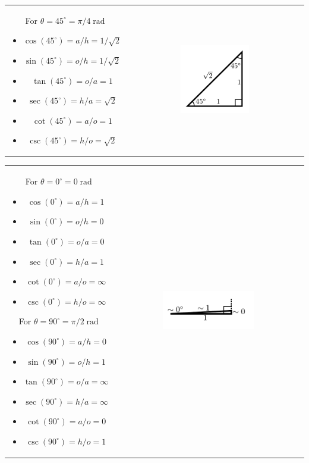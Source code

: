 \documentclass{article}
\newcommand{\dr}[1]{\textcolor{dark_red}{#1}}
\newcommand{\dg}[1]{\textcolor{dark_green}{#1}}
\newcommand{\db}[1]{\textcolor{dark_blue}{#1}}
\begin{document}
\begin{tabular}{cc}
\parbox{0.3\textwidth}{
For \(\theta = 45^\circ = \pi/4\;\text{rad}\)
\begin{itemize}
\item \dr{\(\cos(45^\circ) = a/h = 1/\sqrt{2}\)}
\item \dr{\(\sin(45^\circ) = o/h = 1/\sqrt{2}\)}
\item \dg{\(\tan(45^\circ) = o/a = 1\)}
\item \dg{\(\sec(45^\circ) = h/a = \sqrt{2}\)}
\item \db{\(\cot(45^\circ) = a/o = 1\)}
\item \db{\(\csc(45^\circ) = h/o = \sqrt{2}\)}
\end{itemize}
} & \parbox{0.4\textwidth}{
\includegraphics[width = 0.4\textwidth]{45_45_90_triangle}
}
\end{tabular}

\begin{tabular}{cc}
\parbox{0.3\textwidth}{
For \(\theta = 0^\circ = 0\;\text{rad}\)
\begin{itemize}
\item \dr{\(\cos(0^\circ) = a/h = 1\)}
\item \dr{\(\sin(0^\circ) = o/h = 0\)}
\item \dg{\(\tan(0^\circ) = o/a = 0\)}
\item \dg{\(\sec(0^\circ) = h/a = 1\)}
\item \db{\(\cot(0^\circ) = a/o = \infty\)}
\item \db{\(\csc(0^\circ) = h/o = \infty\)}
\end{itemize}
For \(\theta = 90^\circ = \pi/2\;\text{rad}\)
\begin{itemize}
\item \dr{\(\cos(90^\circ) = a/h = 0\)}
\item \dr{\(\sin(90^\circ) = o/h = 1\)}
\item \dg{\(\tan(90^\circ) = o/a = \infty\)}
\item \dg{\(\sec(90^\circ) = h/a = \infty\)}
\item \db{\(\cot(90^\circ) = a/o = 0\)}
\item \db{\(\csc(90^\circ) = h/o = 1\)}
\end{itemize}
} & \parbox{0.5\textwidth}{
\includegraphics[width = 0.5\textwidth]{00_90_90_triangle}
}
\end{tabular}
\end{document}
